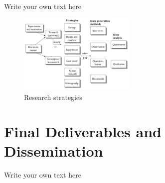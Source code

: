 \documentclass[11pt, a4paper]{article}
\begin{document}
Write your own text here

\begin{figure}[h]
    \center
    \includegraphics[width=0.5\textwidth]{research-strategies.png}
    \caption{Research strategies \cite{oates2005researching}}
    \label{fig:research_strategies}
\end{figure}

\section*{Final Deliverables and Dissemination}

Write your own text here

\printbibliography 
\end{document}
